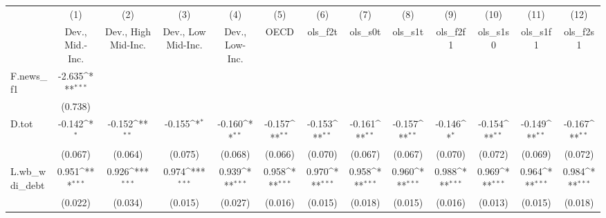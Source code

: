 {
\def\sym#1{\ifmmode^{#1}\else\(^{#1}\)\fi}
\begin{tabular}{l*{12}{c}}
\toprule
            &\multicolumn{1}{c}{(1)}&\multicolumn{1}{c}{(2)}&\multicolumn{1}{c}{(3)}&\multicolumn{1}{c}{(4)}&\multicolumn{1}{c}{(5)}&\multicolumn{1}{c}{(6)}&\multicolumn{1}{c}{(7)}&\multicolumn{1}{c}{(8)}&\multicolumn{1}{c}{(9)}&\multicolumn{1}{c}{(10)}&\multicolumn{1}{c}{(11)}&\multicolumn{1}{c}{(12)}\\
            &\multicolumn{1}{c}{Dev., Mid.-Inc.}&\multicolumn{1}{c}{Dev., High Mid-Inc.}&\multicolumn{1}{c}{Dev., Low Mid-Inc.}&\multicolumn{1}{c}{Dev., Low-Inc.}&\multicolumn{1}{c}{OECD}&\multicolumn{1}{c}{ols\_f2t}&\multicolumn{1}{c}{ols\_s0t}&\multicolumn{1}{c}{ols\_s1t}&\multicolumn{1}{c}{ols\_f2f1}&\multicolumn{1}{c}{ols\_s1s0}&\multicolumn{1}{c}{ols\_s1f1}&\multicolumn{1}{c}{ols\_f2s1}\\
\midrule
F.news\_f1   &      -2.635\sym{***}&                     &                     &                     &                     &                     &                     &                     &                     &                     &                     &                     \\
            &     (0.738)         &                     &                     &                     &                     &                     &                     &                     &                     &                     &                     &                     \\
\addlinespace
D.tot       &      -0.142\sym{*}  &      -0.152\sym{**} &      -0.155\sym{*}  &      -0.160\sym{**} &      -0.157\sym{**} &      -0.153\sym{**} &      -0.161\sym{**} &      -0.157\sym{**} &      -0.146\sym{*}  &      -0.154\sym{**} &      -0.149\sym{**} &      -0.167\sym{**} \\
            &     (0.067)         &     (0.064)         &     (0.075)         &     (0.068)         &     (0.066)         &     (0.070)         &     (0.067)         &     (0.067)         &     (0.070)         &     (0.072)         &     (0.069)         &     (0.072)         \\
\addlinespace
L.wb\_wdi\_debt&       0.951\sym{***}&       0.926\sym{***}&       0.974\sym{***}&       0.939\sym{***}&       0.958\sym{***}&       0.970\sym{***}&       0.958\sym{***}&       0.960\sym{***}&       0.988\sym{***}&       0.969\sym{***}&       0.964\sym{***}&       0.984\sym{***}\\
            &     (0.022)         &     (0.034)         &     (0.015)         &     (0.027)         &     (0.016)         &     (0.015)         &     (0.018)         &     (0.015)         &     (0.016)         &     (0.013)         &     (0.015)         &     (0.018)         \\

\end{tabular}}
